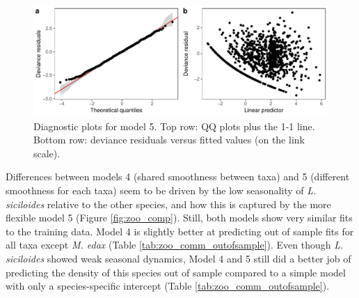 \documentclass[12pt]{article}
\begin{document}
\begin{figure}
\centering
\includegraphics{../figures/zoo_comm_diag-1.pdf}
\caption{\label{fig:zoo_comm_diag_plot} Diagnostic plots for model 5.
Top row: QQ plots plus the 1-1 line. Bottom row: deviance residuals
versus fitted values (on the link scale).}
\end{figure}

Differences between models 4 (shared smoothness between taxa) and 5
(different smoothness for each taxa) seem to be driven by the low
seasonality of \emph{L. siciloides} relative to the other species, and
how this is captured by the more flexible model 5 (Figure
\ref{fig:zoo_comp}). Still, both models show very similar fits to the
training data. Model 4 is slightly better at predicting out of sample
fits for all taxa except \emph{M. edax} (Table
\ref{tab:zoo_comm_outofsample}). Even though \emph{L. siciloides} showed
weak seasonal dynamics, Model 4 and 5 still did a better job of
predicting the density of this species out of sample compared to a
simple model with only a species-specific intercept (Table
\ref{tab:zoo_comm_outofsample}).
\end{document}
